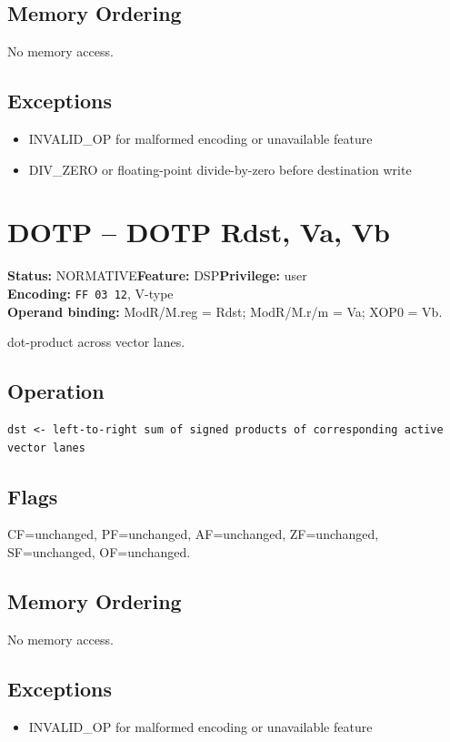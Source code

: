 \documentclass[10pt]{article}
\begin{document}
\subsection*{Memory Ordering}
No memory access.
\subsection*{Exceptions}
\begin{itemize}
\item INVALID\_OP for malformed encoding or unavailable feature
\item DIV\_ZERO or floating-point divide-by-zero before destination write
\end{itemize}
\clearpage

\section{DOTP -- DOTP Rdst, Va, Vb}
\textbf{Status:} NORMATIVE\quad \textbf{Feature:} DSP\quad \textbf{Privilege:} user\\
\textbf{Encoding:} \texttt{FF 03 12}, V-type\\
\textbf{Operand binding:} ModR/M.reg = Rdst; ModR/M.r/m = Va; XOP0 = Vb.

dot-product across vector lanes.

\subsection*{Operation}
\begin{lstlisting}
dst <- left-to-right sum of signed products of corresponding active vector lanes
\end{lstlisting}
\subsection*{Flags}
CF=unchanged, PF=unchanged, AF=unchanged, ZF=unchanged, SF=unchanged, OF=unchanged.
\subsection*{Memory Ordering}
No memory access.
\subsection*{Exceptions}
\begin{itemize}
\item INVALID\_OP for malformed encoding or unavailable feature
\end{itemize}
\clearpage
\end{document}
